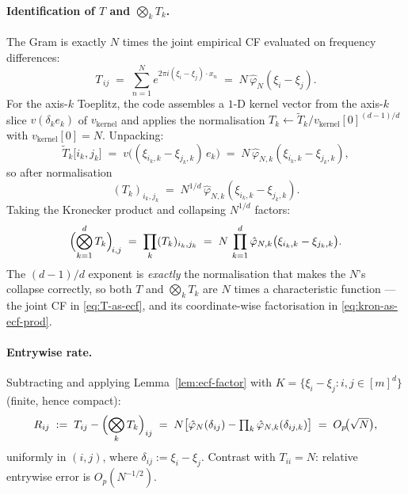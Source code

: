 \documentclass[11pt]{article}
\begin{document}
\paragraph{Identification of $T$ and $\bigotimes_k T_k$.}
The Gram is exactly $N$ times the joint empirical CF evaluated on frequency
differences:
\begin{equation}
  T_{\,ij}
  \;=\; \sum_{n=1}^N e^{2\pi i(\xi_i-\xi_j)\cdot x_n}
  \;=\; N\,\hat\varphi_N(\xi_i-\xi_j).
  \label{eq:T-as-ecf}
\end{equation}
For the axis-$k$ Toeplitz, the code assembles a $1$-D kernel vector from
the axis-$k$ slice $v(\delta_k e_k)$ of $v_{\mathrm{kernel}}$ and applies the
normalisation $T_k \leftarrow \tilde T_k / v_{\mathrm{kernel}}[0]^{(d-1)/d}$
with $v_{\mathrm{kernel}}[0] = N$. Unpacking:
\[
  \tilde T_k\bigl[i_k,j_k\bigr]
  \;=\; v\bigl((\xi_{i_k,k}-\xi_{j_k,k})\,e_k\bigr)
  \;=\; N\,\hat\varphi_{N,k}(\xi_{i_k,k}-\xi_{j_k,k}),
\]
so after normalisation
\begin{equation}
  (T_k)_{i_k,j_k}
  \;=\; N^{1/d}\,\hat\varphi_{N,k}(\xi_{i_k,k}-\xi_{j_k,k}).
  \label{eq:Tk-as-ecf}
\end{equation}
Taking the Kronecker product and collapsing $N^{1/d}$ factors:
\begin{equation}
  \Bigl(\bigotimes_{k=1}^d T_k\Bigr)_{\!i,j}
  \;=\; \prod_k (T_k)_{i_k,j_k}
  \;=\; N\,\prod_{k=1}^d \hat\varphi_{N,k}\bigl(\xi_{i_k,k}-\xi_{j_k,k}\bigr).
  \label{eq:kron-as-ecf-prod}
\end{equation}
The $(d-1)/d$ exponent is \emph{exactly} the normalisation that makes the
$N$'s collapse correctly, so both $T$ and $\bigotimes_k T_k$ are $N$ times a
characteristic function --- the joint CF in \eqref{eq:T-as-ecf}, and its
coordinate-wise factorisation in \eqref{eq:kron-as-ecf-prod}.

\paragraph{Entrywise rate.}
Subtracting and applying Lemma~\ref{lem:ecf-factor} with
$K = \{\xi_i - \xi_j : i,j\in[m]^d\}$ (finite, hence compact):
\begin{equation}
  R_{ij} \;:=\; T_{ij} - \Bigl(\bigotimes_k T_k\Bigr)_{ij}
  \;=\; N\bigl[\hat\varphi_N(\delta_{ij}) - \textstyle\prod_k \hat\varphi_{N,k}(\delta_{ij,k})\bigr]
  \;=\; O_p\!\bigl(\sqrt N\bigr),
  \label{eq:R-entrywise}
\end{equation}
uniformly in $(i,j)$, where $\delta_{ij} := \xi_i-\xi_j$. Contrast with
$T_{ii} = N$: relative entrywise error is $O_p(N^{-1/2})$.
\end{document}
